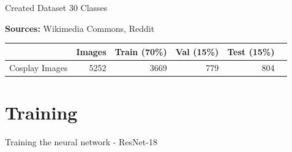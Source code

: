 \documentclass[aspectratio=169]{beamer}
\begin{document}
\begin{frame}{Created Dataset}
    30 Classes 

    \textbf{Sources:} Wikimedia Commons, Reddit 
    \begin{table}[H]
        \centering
        \label{tab:dataset-overview}
        \begin{tabular}{lrrrrr}
             & Images & Train (70\%) & Val (15\%) & Test (15\%) \\ %
            \midrule
            Cosplay Images   & 5252 & 3669 & 779 & 804 \\
            \bottomrule 
        \end{tabular}
    \end{table} 
\end{frame}



\section{Training} %

\begin{frame}
    \centering 
    \Huge 
    Training the neural network - ResNet-18
\end{frame}
\end{document}
